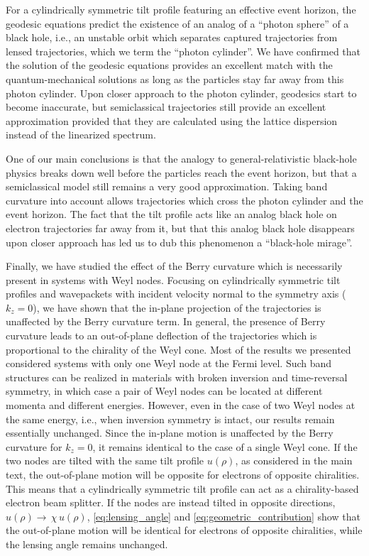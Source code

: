 \documentclass[submission, Phys]{SciPost}
\begin{document}
For a cylindrically symmetric tilt profile featuring an effective event horizon, the geodesic equations predict the existence of an analog of a ``photon sphere'' of a black hole, i.e., an unstable orbit which separates captured trajectories from lensed trajectories, which we term the ``photon cylinder''. We have confirmed that the solution of the geodesic equations provides an excellent match with the quantum-mechanical solutions as long as the particles stay far away from this photon cylinder. Upon closer approach to the photon cylinder, geodesics start to become inaccurate, but semiclassical trajectories still provide an excellent approximation provided that they are calculated using the lattice dispersion instead of the linearized spectrum.

One of our main conclusions is that the analogy to general-relativistic black-hole physics breaks down well before the particles reach the event horizon, but that a semiclassical model still remains a very good approximation. Taking band curvature into account allows trajectories which cross the photon cylinder and the event horizon. The fact that the tilt profile acts like an analog black hole on electron trajectories far away from it, but that this analog black hole disappears upon closer approach has led us to dub this phenomenon a ``black-hole mirage''.

Finally, we have studied the effect of the Berry curvature which is necessarily present in systems with Weyl nodes.
Focusing on cylindrically symmetric tilt profiles and wavepackets with incident velocity normal to the symmetry axis ($k_z=0$), we have shown that the in-plane projection of the trajectories is unaffected by the Berry curvature term.
In general, the presence of Berry curvature leads to an out-of-plane deflection of the trajectories which is proportional to the chirality of the Weyl cone.
Most of the results we presented considered systems with only one Weyl node at the Fermi level. Such band structures can be realized in materials with broken inversion and time-reversal symmetry, in which case a pair of Weyl nodes can be located at different momenta and different energies. However, even in the case of two Weyl nodes at the same energy, i.e., when inversion symmetry is intact, our results remain essentially unchanged.
Since the in-plane motion is unaffected by the Berry curvature for $k_z=0$, it remains identical to the case of a single Weyl cone.
If the two nodes are tilted with the same tilt profile $u(\rho)$, as considered in the main text, the out-of-plane motion will be opposite for electrons of opposite chiralities. This means that a cylindrically symmetric tilt profile can act as a chirality-based electron beam splitter. If the nodes are instead tilted in opposite directions, $u(\rho)\to\,\chi\,u(\rho)$, \cref{eq:lensing_angle} and \cref{eq:geometric_contribution} show that the out-of-plane motion will be identical for electrons of opposite chiralities, while the lensing angle remains unchanged.
\end{document}
